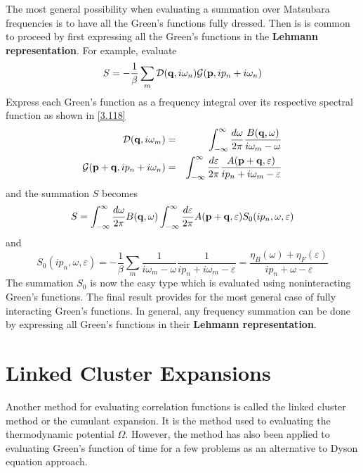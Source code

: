 The most general possibility when evaluating a summation over Matsubara frequencies is to have all the Green's functions fully dressed.
Then is is common to proceed by first expressing all the Green's functions in the \textbf{Lehmann representation}.
For example, evaluate
\begin{equation}
    S = - \frac{1}{\beta} \sum_m \mathcal{D}(\mathbf{q},i\omega_n) \mathcal{G}(\mathbf{p},ip_n + i\omega_n) \label{3.242}
\end{equation}
Express each Green's function as a frequency integral over its respective spectral function as shown in \eqref{3.118}
\begin{eqnarray}
    \mathcal{D} (\mathbf{q},i\omega_m) &=& \int_{-\infty}^\infty \frac{d\omega}{2\pi} \frac{B(\mathbf{q},\omega)}{i\omega_m-\omega}  \label{3.243} \\
    \mathcal{G} (\mathbf{p}+\mathbf{q},ip_n+i\omega_n) &=& \int_{-\infty}^\infty \frac{d \varepsilon}{2\pi}  \frac{A(\mathbf{p}+\mathbf{q}, \varepsilon)}{ip_n + i\omega_m -\varepsilon} \label{3.244}
\end{eqnarray}
and the summation $S$ becomes
\begin{equation}
    S = \int_{-\infty}^\infty \frac{d\omega}{2\pi} B(\mathbf{q},\omega) \int_{-\infty}^\infty \frac{d\varepsilon}{2\pi} A(\mathbf{p}+ \mathbf{q},\varepsilon) S_0(ip_n,\omega,\varepsilon) \nonumber
\end{equation}
and
\begin{equation}
    S_0(ip_n,\omega,\varepsilon) = - \frac{1}{\beta} \sum_m \frac{1}{i\omega_m-\omega} \frac{1}{ip_n+i\omega_m-\varepsilon} = \frac{\eta_B(\omega) + \eta_F(\varepsilon)}{ip_n+\omega-\varepsilon}  \nonumber
\end{equation}
The summation $S_0$ is now the easy type which is evaluated using noninteracting Green's functions.
The final result provides for the most general case of fully interacting Green's functions.
In general, any frequency summation can be done by expressing all Green's functions in their \textbf{Lehmann representation}.

\section{Linked Cluster Expansions}\label{s3.6}
Another method for evaluating correlation functions is called the linked cluster method or the cumulant expansion.
It is the method used to evaluating the thermodynamic potential $\Omega$.
However, the method has also been applied to evaluating Green's function of time for a few problems as an alternative to Dyson equation approach.

